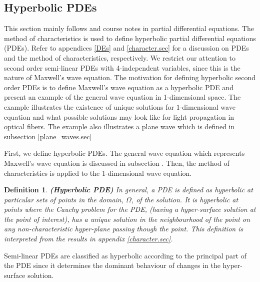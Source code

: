 \documentclass[12pt]{article}
\newtheorem{definition}{Definition}[section]
\theoremstyle{definition}
\numberwithin{equation}{section}
\begin{document}
\subsection{Hyperbolic PDEs}\label{hyp.sec}
This section mainly follows \cite{Kev} and course notes in partial differential equations. The method of characteristics is used to define hyperbolic partial differential equations (PDEs). Refer to appendices \ref{DEs} and \ref{character.sec} for a discussion on PDEs and the method of characteristics, respectively. We restrict our attention to second order semi-linear PDEs with 4-independent variables, since this is the nature of Maxwell's wave equation. The motivation for defining hyperbolic second order PDEs is to define Maxwell's wave equation as a hyperbolic PDE and present an example of the general wave equation in 1-dimensional space. The example illustrates the existence of unique solutions for $1$-dimensional wave equation and what possible solutions may look like for light propagation in optical fibers. The example also illustrates a plane wave which is defined in subsection \ref{plane_waves.sec}

First, we define hyperbolic PDEs. The general wave equation which represents Maxwell's wave equation is discussed in subsection . Then, the method of characteristics is applied to the 1-dimensional wave equation.
\begin{definition}\textbf{(Hyperbolic PDE)}
In general, a PDE is defined as hyperbolic at particular sets of points in the domain, $\Omega$, of the solution. It is hyperbolic at points where the Cauchy problem for the PDE, (having a hyper-surface solution at the point of interest), has a unique solution in the neighbourhood of the point on any non-characteristic hyper-plane passing though the point. This definition is interpreted from the results in appendix \ref{character.sec}.
\end{definition}

Semi-linear PDEs are classified as hyperbolic according to the principal part of the PDE since it determines the dominant behaviour of changes in the hyper-surface solution.
\end{document}
